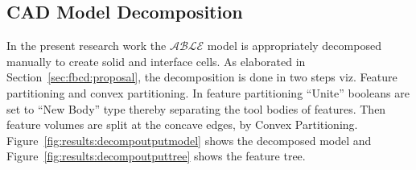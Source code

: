 %
%
%
%
%

\subsection{CAD Model Decomposition}

In the present research work the $\mathcal{ABLE}$ model is appropriately decomposed manually to create solid and interface cells. As elaborated in Section~\ref{sec:fbcd:proposal}, the decomposition is done in two steps viz. Feature partitioning and convex partitioning.  In feature partitioning ``Unite'' booleans are set to ``New Body'' type thereby separating the tool bodies of features. Then feature volumes are split at the concave edges, by Convex Partitioning. Figure~\ref{fig:results:decompoutputmodel} shows the decomposed model and Figure~\ref{fig:results:decompoutputtree} shows the feature tree.



